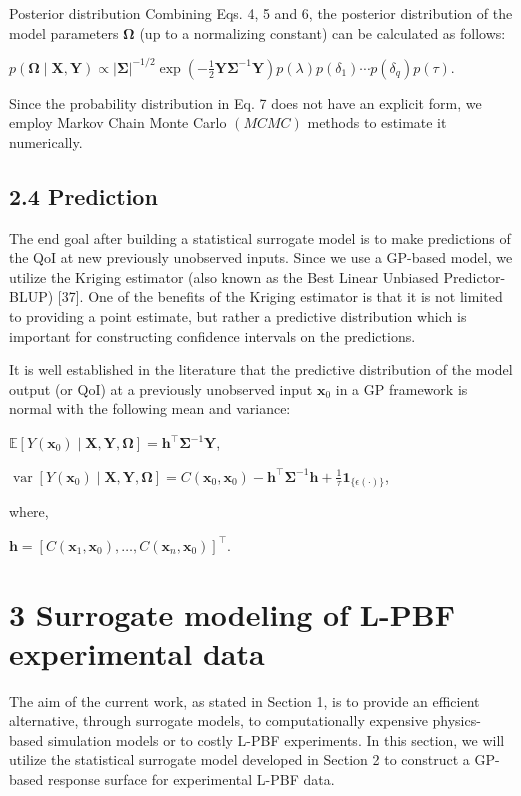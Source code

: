 \documentclass[10pt]{article}
\begin{document}
Posterior distribution Combining Eqs. 4, 5 and 6, the posterior distribution of the model parameters $\boldsymbol{\Omega}$ (up to a normalizing constant) can be calculated as follows:

$p(\boldsymbol{\Omega} \mid \mathbf{X}, \mathbf{Y}) \propto|\boldsymbol{\Sigma}|^{-1 / 2} \exp \left(-\frac{1}{2} \mathbf{Y} \boldsymbol{\Sigma}^{-1} \mathbf{Y}\right) p(\lambda) p\left(\delta_{1}\right) \cdots p\left(\delta_{q}\right) p(\tau)$.

Since the probability distribution in Eq. 7 does not have an explicit form, we employ Markov Chain Monte Carlo $(M C M C)$ methods to estimate it numerically.

\subsection*{2.4 Prediction}
The end goal after building a statistical surrogate model is to make predictions of the QoI at new previously unobserved inputs. Since we use a GP-based model, we utilize the Kriging estimator (also known as the Best Linear Unbiased Predictor-BLUP) [37]. One of the benefits of the Kriging estimator is that it is not limited to providing a point estimate, but rather a predictive distribution which is important for constructing confidence intervals on the predictions.

It is well established in the literature that the predictive distribution of the model output (or QoI) at a previously unobserved input $\mathbf{x}_{0}$ in a GP framework is normal with the following mean and variance:

$\mathbb{E}\left[Y\left(\mathbf{x}_{0}\right) \mid \mathbf{X}, \mathbf{Y}, \boldsymbol{\Omega}\right]=\mathbf{h}^{\top} \boldsymbol{\Sigma}^{-1} \mathbf{Y}$,

$\operatorname{var}\left[Y\left(\mathbf{x}_{0}\right) \mid \mathbf{X}, \mathbf{Y}, \boldsymbol{\Omega}\right]=C\left(\mathbf{x}_{0}, \mathbf{x}_{0}\right)-\mathbf{h}^{\top} \boldsymbol{\Sigma}^{-1} \mathbf{h}+\frac{1}{\tau} \mathbf{1}_{\{\epsilon(\cdot)\}}$,

where,

$\mathbf{h}=\left[C\left(\mathbf{x}_{1}, \mathbf{x}_{0}\right), \ldots, C\left(\mathbf{x}_{n}, \mathbf{x}_{0}\right)\right]^{\top}$.

\section*{3 Surrogate modeling of L-PBF experimental data}
The aim of the current work, as stated in Section 1, is to provide an efficient alternative, through surrogate models, to computationally expensive physics-based simulation models or to costly L-PBF experiments. In this section, we will utilize the statistical surrogate model developed in Section 2 to construct a GP-based response surface for experimental L-PBF data.
\end{document}
